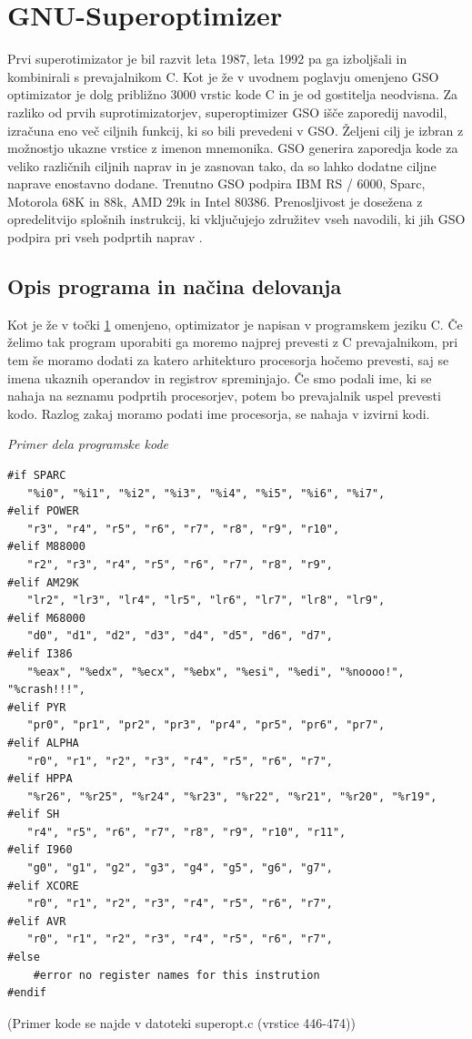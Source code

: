 \documentclass[a4paper, 12pt]{book}
\begin{document}
\chapter{GNU-Superoptimizer \cite{sup1}}
\label{ch2}
Prvi superotimizator je bil razvit leta 1987, leta 1992 pa ga izboljšali in  kombinirali s prevajalnikom C. Kot je že v uvodnem poglavju omenjeno GSO optimizator je dolg približno 3000 vrstic kode C in je od gostitelja neodvisna. Za razliko od prvih suprotimizatorjev, superoptimizer GSO išče zaporedij navodil, izračuna eno več ciljnih funkcij, ki so bili prevedeni v GSO. Željeni cilj je izbran z možnostjo ukazne vrstice z imenon mnemonika. GSO generira zaporedja kode za veliko različnih ciljnih naprav in je zasnovan tako, da so lahko dodatne ciljne naprave enostavno dodane. Trenutno GSO podpira IBM RS / 6000, Sparc, Motorola 68K in 88k, AMD 29k in Intel 80386. Prenosljivost je dosežena z opredelitvijo splošnih instrukcij, ki vključujejo združitev vseh navodili, ki jih GSO podpira pri vseh podprtih naprav \cite{url1}.

\section{Opis programa in načina delovanja}
	\label{prev}
	Kot je že v točki \ref{ch2} omenjeno, optimizator je napisan v programskem jeziku C. Če želimo tak program uporabiti ga moremo najprej prevesti z C prevajalnikom, pri tem še moramo dodati za katero arhitekturo procesorja hočemo prevesti, saj se imena ukaznih operandov in registrov spreminjajo. Če smo podali ime, ki se nahaja na seznamu podprtih procesorjev, potem bo prevajalnik uspel prevesti kodo. Razlog zakaj moramo podati ime procesorja, se nahaja v izvirni kodi.
	
	\medskip
	
	\noindent
	{\it Primer dela programske kode}
\begin{Verbatim}[baselinestretch=1]
#if SPARC
   "%i0", "%i1", "%i2", "%i3", "%i4", "%i5", "%i6", "%i7",
#elif POWER
   "r3", "r4", "r5", "r6", "r7", "r8", "r9", "r10",
#elif M88000
   "r2", "r3", "r4", "r5", "r6", "r7", "r8", "r9",
#elif AM29K
   "lr2", "lr3", "lr4", "lr5", "lr6", "lr7", "lr8", "lr9",
#elif M68000
   "d0", "d1", "d2", "d3", "d4", "d5", "d6", "d7",
#elif I386
   "%eax", "%edx", "%ecx", "%ebx", "%esi", "%edi", "%noooo!", "%crash!!!",
#elif PYR
   "pr0", "pr1", "pr2", "pr3", "pr4", "pr5", "pr6", "pr7",
#elif ALPHA
   "r0", "r1", "r2", "r3", "r4", "r5", "r6", "r7",
#elif HPPA
   "%r26", "%r25", "%r24", "%r23", "%r22", "%r21", "%r20", "%r19",
#elif SH
   "r4", "r5", "r6", "r7", "r8", "r9", "r10", "r11",
#elif I960
   "g0", "g1", "g2", "g3", "g4", "g5", "g6", "g7",
#elif XCORE
   "r0", "r1", "r2", "r3", "r4", "r5", "r6", "r7",
#elif AVR
   "r0", "r1", "r2", "r3", "r4", "r5", "r6", "r7",
#else
	#error no register names for this instrution
#endif
\end{Verbatim}
	\noindent
	{\small (Primer kode se najde v datoteki superopt.c (vrstice 446-474))}
	
\end{document}
